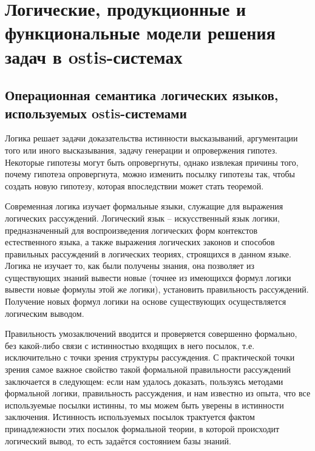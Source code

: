 \chapter{Логические, продукционные и функциональные модели решения задач в ostis-системах}
\label{chapter_logic_productions}


\section{Операционная семантика логических языков, используемых ostis-системами}


Логика решает задачи доказательства истинности высказываний, аргументации того или иного высказывания, задачу генерации и опровержения гипотез. Некоторые гипотезы могут быть опровергнуты, однако извлекая причины того, почему гипотеза опровергнута, можно изменить посылку гипотезы так, чтобы создать новую гипотезу, которая впоследствии может стать теоремой.

Современная логика изучает формальные языки, служащие для выражения логических рассуждений.
Логический язык -- искусственный язык логики, предназначенный для воспроизведения логических форм контекстов естественного языка, а также выражения логических законов и способов правильных рассуждений в логических теориях, строящихся в данном языке. Логика не изучает то, как были получены знания, она позволяет из существующих знаний вывести новые (точнее из имеющихся формул логики вывести новые формулы этой же логики), установить правильность рассуждений. Получение новых формул логики на основе существующих осуществляется логическим выводом.

Правильность умозаключений вводится и проверяется совершенно формально, без какой-либо связи с истинностью входящих в него посылок, т.е. исключительно с точки зрения структуры рассуждения. С практической точки зрения самое важное свойство такой формальной правильности рассуждений заключается в следующем: если нам удалось доказать, пользуясь методами формальной логики, правильность рассуждения, и нам известно из опыта, что все используемые посылки истинны, то мы можем быть уверены в истинности заключения. Истинность используемых посылок трактуется фактом принадлежности этих посылок формальной теории, в которой происходит логический вывод, то есть задаётся состоянием базы знаний.


